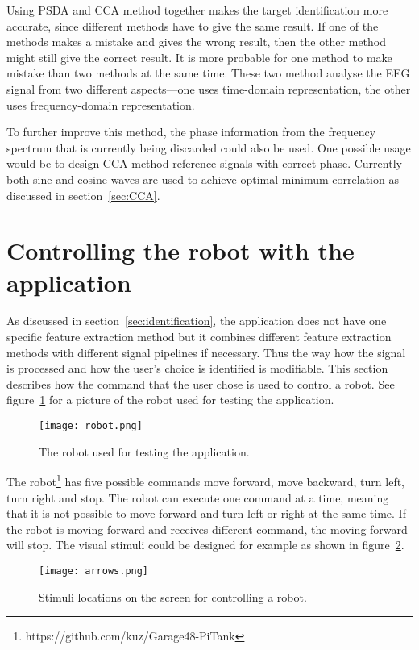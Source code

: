 Using \gls{PSDA} and \gls{CCA} method together makes the \gls{target} identification more accurate, since different methods have to give the same result. If one of the methods makes a mistake and gives the wrong result, then the other method might still give the correct result. It is more probable for one method to make mistake than two methods at the same time. These two method analyse the \gls{EEG} signal from two different aspects---one uses time-domain representation, the other uses frequency-domain representation.

To further improve this method, the phase information from the \gls{frequency spectrum} that is currently being discarded could also be used. One possible usage would be to design \gls{CCA} method \glspl{reference signal} with correct phase. Currently both sine and cosine waves are used to achieve optimal minimum correlation as discussed in section~\ref{sec:CCA}.

\section{Controlling the robot with the application}

As discussed in section~\ref{sec:identification}, the application does not have one specific \gls{feature extraction} method but it combines different \gls{feature extraction} methods with different signal pipelines if necessary. Thus the way how the signal is processed and how the user's choice is identified is modifiable. This section describes how the command that the user chose is used to control a robot. See figure~\ref{fig:robot} for a picture of the robot used for testing the application.

\begin{figure}[h]
	\centering
	\texttt{[image: robot.png]}
	\caption{The robot used for testing the application.}
	\label{fig:robot}
\end{figure}

The robot\footnote{https://github.com/kuz/Garage48-PiTank} has five possible commands move forward, move backward, turn left, turn right and stop. The robot can execute one command at a time, meaning that it is not possible to move forward and turn left or right at the same time. If the robot is moving forward and receives different command, the moving forward will stop. The visual stimuli could be designed for example as shown in figure~\ref{fig:arrow_stimuli}.

\begin{figure}[h]
	\centering
	\texttt{[image: arrows.png]}
	\caption{Stimuli locations on the screen for controlling a robot.}
	\label{fig:arrow_stimuli}
\end{figure}

